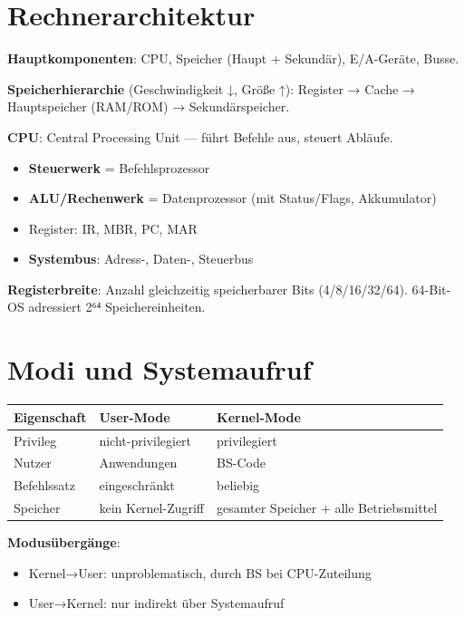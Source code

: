 \documentclass[11pt, a4paper]{article}
\begin{document}
\section{Rechnerarchitektur}

\textbf{Hauptkomponenten}: CPU, Speicher (Haupt + Sekundär), E/A-Geräte, Busse.


\textbf{Speicherhierarchie} (Geschwindigkeit ↓, Größe ↑): Register → Cache → Hauptspeicher (RAM/ROM) → Sekundärspeicher.


\textbf{CPU}: Central Processing Unit — führt Befehle aus, steuert Abläufe.

\begin{itemize}
  \item \textbf{Steuerwerk} = Befehlsprozessor
  \item \textbf{ALU/Rechenwerk} = Datenprozessor (mit Status/Flags, Akkumulator)
  \item Register: IR, MBR, PC, MAR
  \item \textbf{Systembus}: Adress-, Daten-, Steuerbus
\end{itemize}

\textbf{Registerbreite}: Anzahl gleichzeitig speicherbarer Bits (4/8/16/32/64). 64-Bit-OS adressiert 2⁶⁴ Speichereinheiten.



\section{Modi und Systemaufruf}


{\small
\begin{tabularx}{\linewidth}{XXX}
\hline
\rowcolor{tableheadbg}
{\color{white}\textbf{Eigenschaft}} & {\color{white}\textbf{User-Mode}} & {\color{white}\textbf{Kernel-Mode}} \\[2pt]
\hline
\endhead
\hline
\endfoot
Privileg & nicht-privilegiert & privilegiert \\
Nutzer & Anwendungen & BS-Code \\
Befehlssatz & eingeschränkt & beliebig \\
Speicher & kein Kernel-Zugriff & gesamter Speicher + alle Betriebsmittel \\
\end{tabularx}
}


\textbf{Modusübergänge}:

\begin{itemize}
  \item Kernel→User: unproblematisch, durch BS bei CPU-Zuteilung
  \item User→Kernel: nur indirekt über Systemaufruf
\end{itemize}
\end{document}
